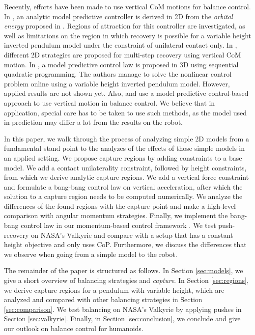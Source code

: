 \documentclass[letterpaper, 10 pt, conference]{ieeeconf}  %
\begin{document}
Recently, efforts have been made to use vertical CoM motions for balance control. In \cite{koolen2016balance}, an analytic model predictive controller is derived in 2D from the \textit{orbital energy} proposed in \cite{pratt2007derivation}. Regions of attraction for this controller are investigated, as well as limitations on the region in which recovery is possible for a variable height inverted pendulum model under the constraint of unilateral contact only. In \cite{gao2017increase}, different 2D strategies are proposed for multi-step recovery using vertical CoM motion. In \cite{caron2018balance}, a model predictive control law is proposed in 3D using sequential quadratic programming. The authors manage to solve the nonlinear control problem online using a variable height inverted pendulum model. However, applied results are not shown yet. Also, \cite{koolen2016balance} and \cite{caron2018balance} use a model predictive control-based approach to use vertical motion in balance control. We believe that in application, special care has to be taken to use such methods, as the model used in prediction may differ a lot from the results on the robot.

In this paper, we walk through the process of analyzing simple 2D models from a fundamental stand point to the analyzes of the effects of those simple models in an applied setting. We propose capture regions by adding constraints to a base model. We add a contact unilaterality constraint, followed by height constraints, from which we derive analytic capture regions. We add a vertical force constraint and formulate a bang-bang control law on vertical acceleration, after which the solution to a capture region needs to be computed numerically. We analyze the differences of the found regions with the capture point and make a high-level comparison with angular momentum strategies. Finally, we implement the bang-bang control law in our momentum-based control framework \cite{koolen2016design}. We test push-recovery on NASA's Valkyrie \cite{radford2015valkyrie} and compare with a setup that has a constant height objective and only uses CoP. Furthermore, we discuss the differences that we observe when going from a simple model to the robot.

The remainder of the paper is structured as follows. In Section \ref{sec:models}, we give a short overview of balancing strategies  and \textit{capture}. In Section \ref{sec:regions}, we derive capture regions for a pendulum with variable height, which are analyzed and compared with other balancing strategies in Section \ref{sec:comparison}. We test balancing on NASA's Valkyrie by applying pushes in Section \ref{sec:valkyrie}. Finally, in Section \ref{sec:conclusion}, we conclude and give our outlook on balance control for humanoids.
\end{document}
